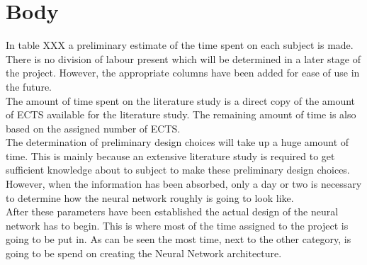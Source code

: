 \section{Body}

In table XXX a preliminary estimate of the time spent on each subject is made. There is no division of labour present which will be determined in a later stage of the project. However, the appropriate columns have been added for ease of use in the future. \\

The amount of time spent on the literature study is a direct copy of the amount of ECTS available for the literature study. The remaining amount of time is also based on the assigned number of ECTS.\\

The determination of preliminary design choices will take up a huge amount of time. This is mainly because an extensive literature study is required to get sufficient knowledge about to subject to make these preliminary design choices. However, when the information has been absorbed, only a day or two is necessary to determine how the neural network roughly is going to look like. \\

After these parameters have been established the actual design of the neural network has to begin. This is where most of the time assigned to the project is going to be put in. As can be seen the most time, next to the other category, is going to be spend on creating the Neural Network architecture. \\




